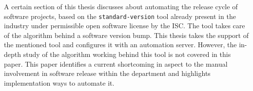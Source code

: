 
A certain section of this thesis discusses about automating the release cycle of software projects, based on the \texttt{standard-version} tool already present in the industry under permissible open software license by the \ac{ISC}. The tool takes care of the algorithm behind a software version bump. This thesis takes the support of the mentioned tool and configures it with an automation server. However, the in-depth study of the algorithm working behind this tool is not covered in this paper. This paper identifies a current shortcoming in aspect to the manual involvement in software release within the department and highlights implementation ways to automate it.























\clearpage\null\thispagestyle{empty}



